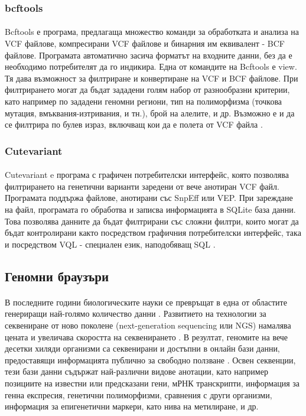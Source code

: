 \documentclass[pdftex,cyrillic,14pt,a4page,twoside,openright]{extreport}
\begin{document}
\subsubsection{bcftools}
\paragraph{}
Bcftools е програма, предлагаща множество команди за обработката и анализа на VCF файлове, компресирани VCF файлове и бинарния им еквивалент - BCF файлове. Програмата автоматично засича форматът на входните данни, без да е необходимо потребителят да го индикира. Една от командите на Bcftools е view. Тя дава възможност за филтриране и конвертиране на VCF и BCF файлове. При филтрирането могат да бъдат зададени голям набор от разнообразни критерии, като например по зададени геномни региони, тип на полиморфизма (точкова мутация, вмъквания-изтривания, и тн.), брой на алелите, и др. Възможно е и да се филтрира по булев израз, включващ кои да е полета от VCF файла \cite{danecek2021}.


\subsubsection{Cutevariant}
\paragraph{}
Cutevariant e програма с графичен потребителски интерфейс, която позволява филтрирането на генетични варианти заредени от вече анотиран VCF файл. Програмата поддържа файлове, анотирани със SnpEff или VEP. При зареждане на файл, програмата го обработва и записва информацията в SQLite база данни. Това позволява данните да бъдат филтрирани със сложни филтри, които могат да бъдат контролирани както посредством графичния потребителски интерфейс, така и посредством VQL - специален език, наподобяващ SQL \cite{schutz2021}.

\subsection{Геномни браузъри}
\paragraph{}
В последните години биологическите науки се превръщат в една от областите генериращи най-голямо количество данни \cite{Stephens2015}. Развитието на технологии за секвениране от ново поколене (next-generation sequencing или NGS) намалява цената и увеличава скоростта на секвенирането \cite{schuster2008}. В резултат, геномите на вече десетки хиляди организми са секвенирани и достъпни в онлайн бази данни, предоставящи информацията публично за свободно ползване \cite{mukherjee2020}. Освен секвенции, тези бази данни съдържат най-различни видове анотации, като например позициите на известни или предсказани гени, мРНК транскрипти, информация за генна експресия, генетични полиморфизми, сравнения с други организми, информация за епигенетични маркери, като нива на метилиране, и др.
\end{document}
